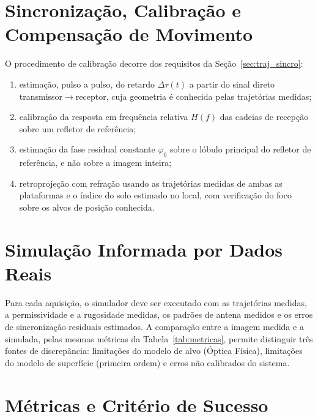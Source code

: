 \documentclass[12pt,a4paper,oneside]{book}
\theoremstyle{remark}
\theoremstyle{plain}
\theoremstyle{definition}
\begin{document}
\section{Sincronização, Calibração e Compensação de Movimento}
\label{sec:real_calibracao}


O procedimento de calibração decorre dos requisitos da
Seção~\ref{sec:traj_sincro}:
\begin{enumerate}
  \item estimação, pulso a pulso, do retardo $\Delta\tau(t)$ a partir do sinal
  direto transmissor$\to$receptor, cuja geometria é conhecida pelas trajetórias
  medidas;
  \item calibração da resposta em frequência relativa $H(f)$ das cadeias de
  recepção sobre um refletor de referência;
  \item estimação da fase residual constante $\varphi_0$ sobre o lóbulo principal
  do refletor de referência, e não sobre a imagem inteira;
  \item retroprojeção com refração usando as trajetórias medidas de ambas as
  plataformas e o índice do solo estimado no local, com verificação do foco sobre
  os alvos de posição conhecida.
\end{enumerate}

\section{Simulação Informada por Dados Reais}
\label{sec:real_simulacao}


Para cada aquisição, o simulador deve ser executado com as trajetórias medidas,
a permissividade e a rugosidade medidas, os padrões de antena medidos e os erros
de sincronização residuais estimados. A comparação entre a imagem medida e a
simulada, pelas mesmas métricas da Tabela~\ref{tab:metricas}, permite distinguir
três fontes de discrepância: limitações do modelo de alvo (Óptica Física),
limitações do modelo de superfície (primeira ordem) e erros não calibrados do
sistema.

\section{Métricas e Critério de Sucesso}
\label{sec:real_criterio}
\end{document}
